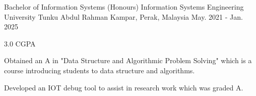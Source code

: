 

\begin{cventries}

  \cventry
    {Bachelor of Information Systems (Honours) Information Systems Engineering} %
    {University Tunku Abdul Rahman} %
    {Kampar, Perak, Malaysia} %
    {May. 2021 - Jan. 2025} %
    {
      \begin{cvitems} %
        \item {3.0 CGPA}
        \item {Obtained an A in "Data Structure and Algorithmic Problem Solving" which is a course introducing students to data structure and algorithms.}
        \item {Developed an IOT debug tool to assist in research work which was graded A.}
      \end{cvitems}
    }
\end{cventries}

